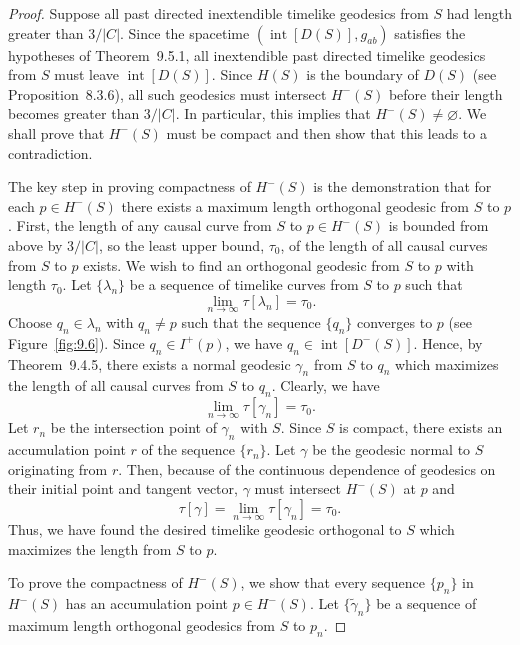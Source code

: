\begin{proof}
Suppose all past directed inextendible timelike geodesics from \(S\) had length
greater than \(3/\lvert C\rvert\). Since the spacetime
\((\operatorname{int}[D(S)],g_{ab})\) satisfies the hypotheses of Theorem~9.5.1, all
inextendible past directed timelike geodesics from \(S\) must leave
\(\operatorname{int}[D(S)]\). Since \(H(S)\) is the boundary of \(D(S)\) (see
Proposition~8.3.6), all such geodesics must intersect \(H^-(S)\) before their length
becomes greater than \(3/\lvert C\rvert\). In particular, this implies that
\(H^-(S)\ne\varnothing\). We shall prove that \(H^-(S)\) must be compact and then
show that this leads to a contradiction.

The key step in proving compactness of \(H^-(S)\) is the demonstration that for each
\(p\in H^-(S)\) there exists a maximum length orthogonal geodesic from \(S\) to
\(p\). First, the length of any causal curve from \(S\) to \(p\in H^-(S)\) is bounded
from above by \(3/\lvert C\rvert\), so the least upper bound, \(\tau_0\), of the length
of all causal curves from \(S\) to \(p\) exists. We wish to find an orthogonal
geodesic from \(S\) to \(p\) with length \(\tau_0\). Let \(\{\lambda_n\}\) be a
sequence of timelike curves from \(S\) to \(p\) such that
\[
  \lim_{n\to\infty}\tau[\lambda_n]=\tau_0 .
\]
Choose \(q_n\in\lambda_n\) with \(q_n\ne p\) such that the sequence
\(\{q_n\}\) converges to \(p\) (see Figure~\ref{fig:9.6}). Since \(q_n\in I^+(p)\),
we have \(q_n\in\operatorname{int}[D^-(S)]\). Hence, by Theorem~9.4.5, there exists
a normal geodesic \(\gamma_n\) from \(S\) to \(q_n\) which maximizes the length of all
causal curves from \(S\) to \(q_n\). Clearly, we have
\[
  \lim_{n\to\infty}\tau[\gamma_n]=\tau_0 .
\]
Let \(r_n\) be the intersection point of \(\gamma_n\) with \(S\). Since \(S\) is
compact, there exists an accumulation point \(r\) of the sequence \(\{r_n\}\). Let
\(\gamma\) be the geodesic normal to \(S\) originating from \(r\). Then, because of
the continuous dependence of geodesics on their initial point and tangent vector,
\(\gamma\) must intersect \(H^-(S)\) at \(p\) and
\[
  \tau[\gamma]=\lim_{n\to\infty}\tau[\gamma_n]=\tau_0 .
\]
Thus, we have found the desired timelike geodesic orthogonal to \(S\) which
maximizes the length from \(S\) to \(p\).

To prove the compactness of \(H^-(S)\), we show that every sequence \(\{p_n\}\) in
\(H^-(S)\) has an accumulation point \(p\in H^-(S)\). Let
\(\{\widetilde\gamma_n\}\) be a sequence of maximum length orthogonal geodesics from
\(S\) to \(p_n\).


\end{proof}
